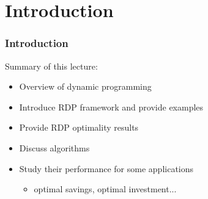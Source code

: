 


\subtitle{Dynamic Programming}

\author{John Stachurski}

\date{September 2022}




\begin{frame}
  \titlepage
\end{frame}


\section{Introduction}


\begin{frame}
    \frametitle{Introduction}

    Summary of this lecture:

    \begin{itemize}
        \item Overview of dynamic programming
            \vspace{0.3em}
            \vspace{0.3em}
        \item Introduce RDP framework and provide examples
            \vspace{0.3em}
            \vspace{0.3em}
        \item Provide RDP optimality results
            \vspace{0.3em}
            \vspace{0.3em}
        \item Discuss algorithms
            \vspace{0.3em}
            \vspace{0.3em}
        \item Study their performance for some applications
            \vspace{0.3em}
            \vspace{0.3em}
            \begin{itemize}
                \item optimal savings, optimal investment...
            \end{itemize}
    \end{itemize}

            \vspace{0.3em}
            \vspace{0.3em}


\end{frame}





